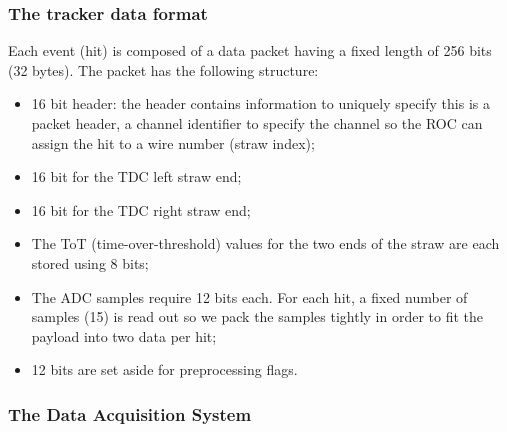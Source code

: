 \subsubsection{The tracker data format}
Each event (hit) is composed of a data packet having a fixed length of 256 bits (32 bytes).
The packet has the following structure:
\begin{itemize}
    \item 16 bit header: the header contains information to uniquely specify this is a
    packet header, a channel identifier to specify the channel so the ROC can
    assign the hit to a wire number (straw index);
    \item 16 bit for the TDC left straw end;
    \item 16 bit for the TDC right straw end;
    \item The ToT (time-over-threshold) values for the two ends 
    of the straw are each stored using 8 bits;
    \item The ADC samples require 12 bits each. For each hit, a fixed number of 
    samples (15) is read out so we
    pack the samples tightly in order to fit the payload into two data per hit;
    \item 12 bits are set aside for preprocessing flags.
\end{itemize}

\subsubsection{The Data Acquisition System}\label{tdaqtra}

